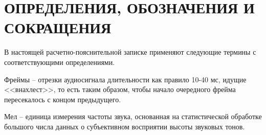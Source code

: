 \part*{ОПРЕДЕЛЕНИЯ, ОБОЗНАЧЕНИЯ И\\СОКРАЩЕНИЯ}

В настоящей расчетно-пояснительной записке применяют следующие термины с соответствующими определениями.

\begin{enumdescript}
	\item[Фреймы] -- отрезки аудиосигнала длительности как правило 10-40 мс, идущие <<внахлест>>, то есть таким
	образом, чтобы начало очередного фрейма пересекалось с концом предыдущего. 
	\item[Мел] -- единица измерения частоты звука, основанная на статистической обработке большого числа данных о субъективном восприятии высоты звуковых тонов.
\end{enumdescript}